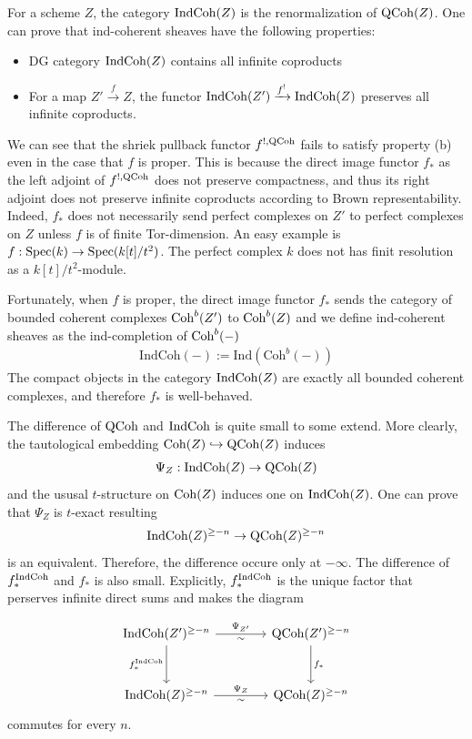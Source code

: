{For a scheme $Z$, the category $\operatorname{IndCoh}(Z)$ is the renormalization of $\operatorname{QCoh}(Z)$. 
One can prove that ind-coherent sheaves have the following properties:
\begin{itemize}
    \item[a.] DG category $\operatorname{IndCoh}(Z)$ contains all infinite coproducts
    \item[b.] For a map $Z'\xrightarrow{f}Z$, the functor $\operatorname{IndCoh}(Z')\xrightarrow{f^!}\operatorname{IndCoh}(Z)$ preserves all infinite coproducts.
\end{itemize}
We can see that the shriek pullback functor $f^{!,\operatorname{QCoh}}$ fails to satisfy property (b) even in the case that $f$ is proper.
This is because the direct image functor $f_*$ as the left adjoint of $f^{!,\operatorname{QCoh}}$ does not preserve compactness, and thus its right adjoint does not preserve infinite coproducts according to Brown representability. Indeed, $f_*$ does not necessarily
send perfect complexes on $Z'$ to perfect complexes on $Z$ unless $f$ is of finite Tor-dimension.
An easy example is $f:\operatorname{Spec}(k)\to \operatorname{Spec}(k[t]/t^2)$. The perfect complex $k$ does not has finit resolution as a $k[t]/t^2$-module.

Fortunately, when $f$ is proper, the direct image functor $f_*$ sends the category of bounded coherent complexes $\operatorname{Coh}^b(Z')$ to $\operatorname{Coh}^b(Z)$ and we define ind-coherent sheaves as the ind-completion of $\operatorname{Coh}^b(-)$
\begin{align*}
    \mathrm{IndCoh}(-) := \mathrm{Ind}(\mathrm{Coh}^b(-))
\end{align*}
The compact objects in the category $\operatorname{IndCoh}(Z)$ are exactly all bounded coherent complexes, and therefore $f_*$ is well-behaved.

The difference of $\operatorname{QCoh}$ and $\operatorname{IndCoh}$ is quite small to some extend. More clearly, the tautological embedding $\operatorname{Coh}(Z)\hookrightarrow \operatorname{QCoh}(Z)$ induces 
\begin{align*}
    \Psi_Z: \operatorname{IndCoh}(Z) \to \operatorname{QCoh}(Z)
\end{align*}
and the ususal $t$-structure on $\operatorname{Coh}(Z)$ induces one on $\operatorname{IndCoh}(Z)$. One can prove that $\Psi_Z$
is $t$-exact resulting 
\begin{align*}
    \operatorname{IndCoh}(Z)^{\ge -n} \to \operatorname{QCoh}(Z)^{\ge -n}
\end{align*}
is an equivalent. Therefore, the difference occure only at $-\infty$.
The difference of $f_*^{\operatorname{IndCoh}}$ and $f_*$ is also small. Explicitly, $f_*^{\operatorname{IndCoh}}$ is the unique factor that perserves infinite direct sums and makes the diagram


\[
\begin{tikzcd}[column sep=4em, row sep=3em, ampersand replacement=\&]
\text{IndCoh}(Z')^{\ge -n} \ar[r, "\Psi_{Z'}", "\sim"'] \ar[d, "f_*^{\text{IndCoh}}"'] 
\& \text{QCoh}(Z')^{\ge -n} \ar[d, "f_*"] \\
\text{IndCoh}(Z)^{\ge -n} \ar[r, "\Psi_Z", "\sim"'] 
\& \text{QCoh}(Z)^{\ge -n}
\end{tikzcd}
\]
commutes for every $n$. 

}
